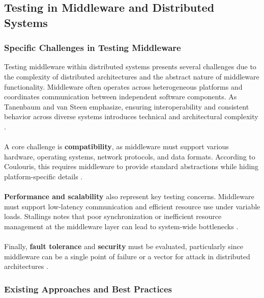 \subsection{Testing in Middleware and Distributed Systems}

\subsubsection{Specific Challenges in Testing Middleware}

Testing middleware within distributed systems presents several challenges due to the complexity of distributed architectures and the abstract nature of middleware functionality. Middleware often operates across heterogeneous platforms and coordinates communication between independent software components. As Tanenbaum and van Steen emphasize, ensuring interoperability and consistent behavior across diverse systems introduces technical and architectural complexity \cite{tanenbaum2017}.
\\
\\
A core challenge is \textbf{compatibility}, as middleware must support various hardware, operating systems, network protocols, and data formats. According to Coulouris, this requires middleware to provide standard abstractions while hiding platform-specific details \cite{coulouris2012}. 
\\
\\
\textbf{Performance and scalability} also represent key testing concerns. Middleware must support low-latency communication and efficient resource use under variable loads. Stallings notes that poor synchronization or inefficient resource management at the middleware layer can lead to system-wide bottlenecks \cite{stallings2018}.
\\
\\
Finally, \textbf{fault tolerance} and \textbf{security} must be evaluated, particularly since middleware can be a single point of failure or a vector for attack in distributed architectures \cite{liu2009middleware}.

\subsubsection{Existing Approaches and Best Practices}


